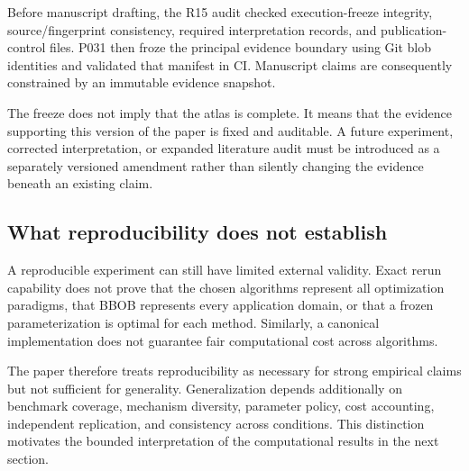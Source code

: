 Before manuscript drafting, the R15 audit checked execution-freeze integrity, source/fingerprint consistency, required interpretation records, and publication-control files. P031 then froze the principal evidence boundary using Git blob identities and validated that manifest in CI. Manuscript claims are consequently constrained by an immutable evidence snapshot.

The freeze does not imply that the atlas is complete. It means that the evidence supporting this version of the paper is fixed and auditable. A future experiment, corrected interpretation, or expanded literature audit must be introduced as a separately versioned amendment rather than silently changing the evidence beneath an existing claim.

\subsection{What reproducibility does not establish}

A reproducible experiment can still have limited external validity. Exact rerun capability does not prove that the chosen algorithms represent all optimization paradigms, that BBOB represents every application domain, or that a frozen parameterization is optimal for each method. Similarly, a canonical implementation does not guarantee fair computational cost across algorithms.

The paper therefore treats reproducibility as necessary for strong empirical claims but not sufficient for generality. Generalization depends additionally on benchmark coverage, mechanism diversity, parameter policy, cost accounting, independent replication, and consistency across conditions. This distinction motivates the bounded interpretation of the computational results in the next section.
